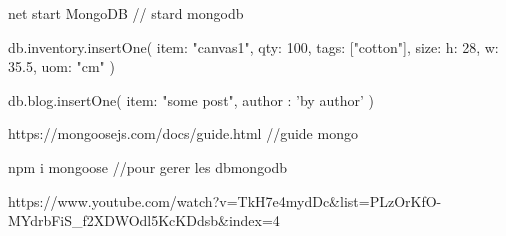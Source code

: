 net start MongoDB  // stard mongodb

db.inventory.insertOne(
   { item: "canvas1", qty: 100, tags: ["cotton"], size: { h: 28, w: 35.5, uom: "cm" } }
)

db.blog.insertOne(
   { item: "some post", author : 'by author' }
)

https://mongoosejs.com/docs/guide.html  //guide mongo

npm i mongoose //pour gerer les dbmongodb

https://www.youtube.com/watch?v=TkH7e4mydDc&list=PLzOrKfO-MYdrbFiS_f2XDWOdl5KcKDdsb&index=4